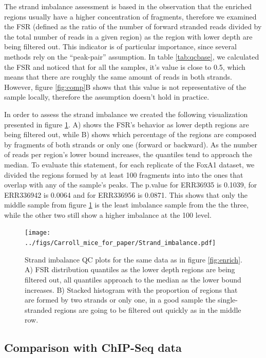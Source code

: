 \documentclass{bmcart}\usepackage[]{graphicx}\usepackage[]{color}
\begin{document}
The strand imbalance assessment is based in the observation that the
enriched regions usually have a higher concentration of fragments,
therefore we examined the FSR (defined as the ratio of the number of
forward stranded reads divided by the total number of reads in a given
region) as the region with lower depth are being filtered out. This
indicator is of particular importance, since several methods rely on
the ``peak-pair'' assumption. In table \ref{tab:qcbase}, we calculated
the FSR and noticed that for all the samples, it's value is close to
0.5, which means that there are roughly the same amount of reads in
both strands. However, figure \ref{fig:comp}B shows that this value is
not representative of the sample locally, therefore the assumption
doesn't hold in practice.



In order to assess the strand imbalance we created the following
visualization presented in figure \ref{fig:strand}. A) shows the FSR's
behavior as lower depth regions are being filtered out, while B) shows
which percentage of the regions are composed by fragments of both
strands or only one (forward or backward). As the number of reads per
region's lower bound increases, the quantiles tend to approach the
median. To evaluate this statement, for each replicate of the FoxA1
dataset, we divided the regions formed by at least 100
fragments into into the ones that overlap with any of the sample's
peaks. The p.value for ERR36935 is 0.1039, for ERR336942 is
0.0064 and for ERR336956 is 0.0871. This shows
that only the middle sample from figure \ref{fig:strand} is the least
imbalance sample from the the three, while the other two still show a
higher imbalance at the 100 level.

\begin{figure}[h!]
  \centering  
  \texttt{[image: ../figs/Carroll\_mice\_for\_paper/Strand\_imbalance.pdf]} 
  \caption{Strand imbalance QC plots for the same data as in figure
    \ref{fig:enrich}. A) FSR distribution quantiles as the lower depth
    regions are being filtered out, all quantiles approach to the
    median as the lower bound increases. B) Stacked histogram with the
    proportion of regions that are formed by two strands or only one,
    in a good sample the single-stranded regions are going to be
    filtered out quickly as in the middle row.}
  \label{fig:strand}
\end{figure}



\subsection{Comparison with ChIP-Seq data}
\label{sec:comp}
\end{document}
